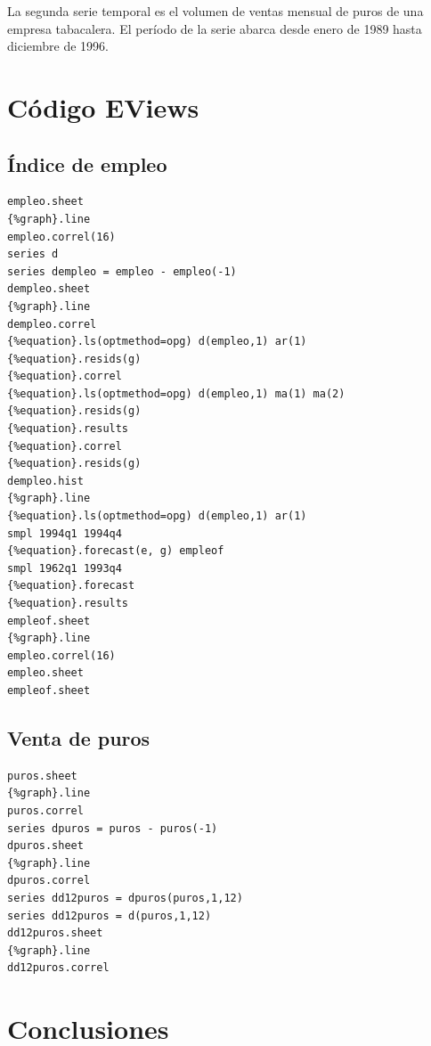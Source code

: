 \documentclass[12pt,a4paper,twoside,openright,titlepage,final]{article}
\begin{document}
La segunda serie temporal es el volumen de ventas mensual de puros de una empresa tabacalera. El período de la serie abarca desde enero de 1989 hasta diciembre de 1996.

\section{Código EViews}

\subsection{Índice de empleo}

\begin{verbatim}
empleo.sheet
{%graph}.line
empleo.correl(16)
series d
series dempleo = empleo - empleo(-1)
dempleo.sheet
{%graph}.line
dempleo.correl
{%equation}.ls(optmethod=opg) d(empleo,1) ar(1)
{%equation}.resids(g)
{%equation}.correl
{%equation}.ls(optmethod=opg) d(empleo,1) ma(1) ma(2)
{%equation}.resids(g)
{%equation}.results
{%equation}.correl
{%equation}.resids(g)
dempleo.hist
{%graph}.line
{%equation}.ls(optmethod=opg) d(empleo,1) ar(1)
smpl 1994q1 1994q4
{%equation}.forecast(e, g) empleof
smpl 1962q1 1993q4
{%equation}.forecast 
{%equation}.results
empleof.sheet
{%graph}.line
empleo.correl(16)
empleo.sheet
empleof.sheet
\end{verbatim}

\subsection{Venta de puros}


\begin{verbatim}
puros.sheet
{%graph}.line
puros.correl
series dpuros = puros - puros(-1)
dpuros.sheet
{%graph}.line
dpuros.correl
series dd12puros = dpuros(puros,1,12)
series dd12puros = d(puros,1,12)
dd12puros.sheet
{%graph}.line
dd12puros.correl
\end{verbatim}


\section{Conclusiones}
\end{document}
